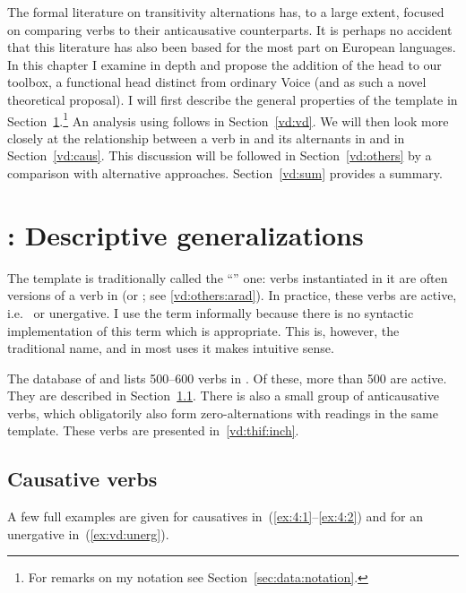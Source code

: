The formal literature on transitivity alternations has, to a large extent, focused on comparing  verbs to their anticausative counterparts. It is perhaps no accident that this literature has also been based for the most part on European languages. In this chapter I examine {\thif} in depth and propose the addition of the head {\vd} to our toolbox, a functional head distinct from ordinary Voice (and as such a novel theoretical proposal). I will first describe the general properties of the template {\thif} in Section~\ref{vd:thif}.\footnote{For remarks on my notation see Section~\ref{sec:data:notation}.} An analysis using {\vd} follows in Section~\ref{vd:vd}. We will then look more closely at the relationship between a verb in {\tkal} and its alternants in {\tnif} and {\thif} in Section~\ref{vd:caus}. This discussion will be followed in Section~\ref{vd:others} by a comparison with alternative approaches. Section~\ref{vd:sum} provides a summary.


\section{\thif: Descriptive generalizations} \label{vd:thif}
The template {\thif} is traditionally called the ``'' one: verbs instantiated in it are often  versions of a verb in {\tkal} (or {\tnif}; see \ref{vd:others:arad}). In practice, these verbs are active, i.e.~ or unergative. I use the term \textsc{} informally because there is no syntactic implementation of this term which is appropriate. This is, however, the traditional name, and in most  uses it makes intuitive sense.

The database of \cite{ehrenfeld12} and \cite{ahdout19phd} lists 500--600 verbs in {\thif}. Of these, more than 500 are active. They are described in Section~\ref{vd:thif:caus}. There is also a small group of anticausative verbs, which obligatorily also form zero-alternations with  readings in the same template. These verbs are presented in~\ref{vd:thif:inch}.

	\subsection{Causative verbs} \label{vd:thif:caus}
A few full examples are given for causatives in~(\ref{ex:4:1}--\ref{ex:4:2}) and for an unergative in~(\ref{ex:vd:unerg}).\largerpage


